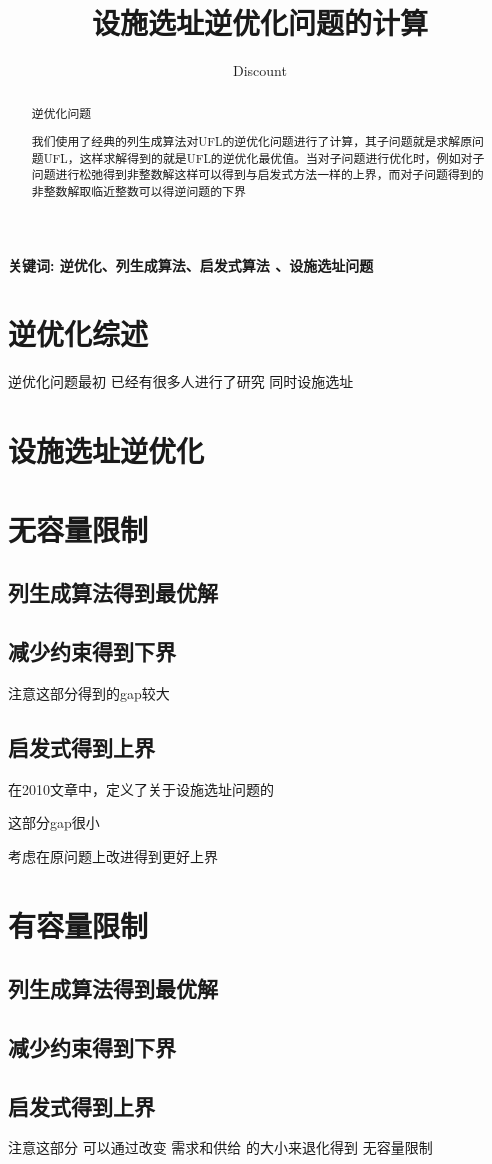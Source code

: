 \documentclass[UTF8]{article}
\author {Dis\cdot count}
\title {设施选址逆优化问题的计算}
\date{}
\begin{document}
    \maketitle

\begin{abstract}

逆优化问题

我们使用了经典的列生成算法对UFL的逆优化问题进行了计算，其子问题就是求解原问题UFL，这样求解得到的就是UFL的逆优化最优值。当对子问题进行优化时，例如对子问题进行松弛得到非整数解这样可以得到与启发式方法一样的上界，而对子问题得到的非整数解取临近整数可以得逆问题的下界


\end{abstract}

\qquad \textbf{关键词: 逆优化、列生成算法、启发式算法 、设施选址问题}

\section{逆优化综述}  %

逆优化问题最初
已经有很多人进行了研究
同时设施选址

\section{设施选址逆优化}

\section{无容量限制}




\subsection{列生成算法得到最优解}



\subsection{减少约束得到下界}

注意这部分得到的gap较大

\subsection{启发式得到上界}

在2010文章中，定义了关于设施选址问题的


这部分gap很小

考虑在原问题上改进得到更好上界

\section{有容量限制}

\subsection{列生成算法得到最优解}

\subsection{减少约束得到下界}


\subsection{启发式得到上界}

注意这部分 可以通过改变 需求和供给 的大小来退化得到 无容量限制
\end{document}
